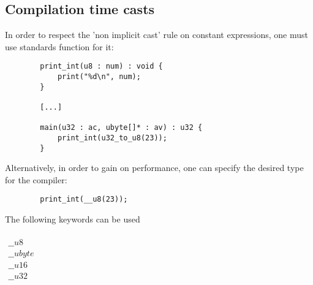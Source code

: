 \subsection{Compilation time casts} \label{comp_cast}

In order to respect the 'non implicit cast' rule on constant expressions,
one must use standards function for it:
\begin{lstlisting}
        print_int(u8 : num) : void {
            print("%d\n", num);
        }

        [...]

        main(u32 : ac, ubyte[]* : av) : u32 {
            print_int(u32_to_u8(23));
        }
\end{lstlisting}
Alternatively, in order to gain on performance, one can specify
the desired type for the compiler:
\begin{lstlisting}
        print_int(__u8(23));
\end{lstlisting}
The following keywords can be used
\\\\
$\begin{array}{l}
\_\_u8\\
\_\_ubyte\\
\_\_u16\\
\_\_u32\\
\end{array}$
\\\\
